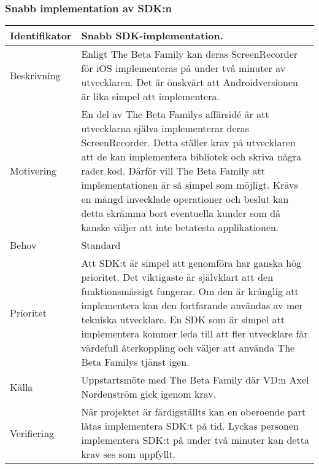 \subsubsection{Snabb implementation av SDK:n}
\begin{tabular}{ | p{65pt} | p{300pt} |}
  \hline
  Identifikator &
  Snabb SDK-implementation.
  \\ \hline
  Beskrivning & 
  Enligt The Beta Family kan deras ScreenRecorder för iOS implementeras på under två minuter av utvecklaren. Det är önskvärt att Androidversionen är lika simpel att implementera.
  \\ \hline
  Motivering &
  En del av The Beta Familys affärsidé är att utvecklarna själva implementerar deras ScreenRecorder. Detta ställer krav på utvecklaren att de kan implementera bibliotek och skriva några rader kod. Därför vill The Beta Family att implementationen är så simpel som möjligt. Krävs en mängd invecklade operationer och beslut kan detta skrämma bort eventuella kunder som då kanske väljer att inte betatesta applikationen.
  \\ \hline
  Behov &
  Standard
  \\ \hline
  Prioritet &
  Att SDK:t är simpel att genomföra har ganska hög prioritet. Det viktigaste är självklart att den funktionsmässigt fungerar. Om den är krånglig att implementera kan den fortfarande användas av mer tekniska utvecklare. En SDK som är simpel att implementera kommer leda till att fler utvecklare får värdefull återkoppling och väljer att använda The Beta Familys tjänst igen.
  \\ \hline
  Källa &
  Uppstartsmöte med The Beta Family där VD:n Axel Nordenström gick igenom krav.
  \\ \hline
  Verifiering &
  När projektet är färdigställts kan en oberoende part låtas implementera SDK:t på tid. Lyckas personen implementera SDK:t på under två minuter kan detta krav ses som uppfyllt.
  \\ \hline
\end{tabular}


